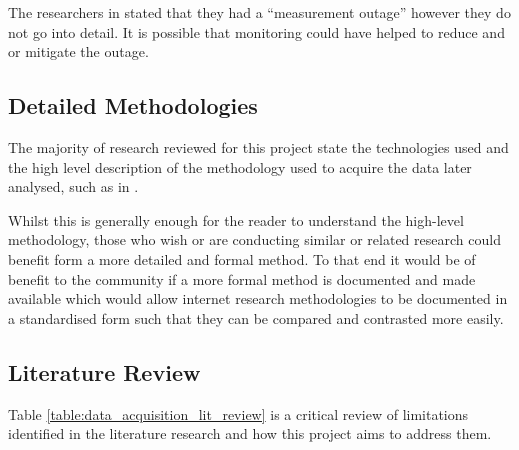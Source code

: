 \documentclass{mscreport}
\begin{document}
\vspace{0.3cm} \noindent
The researchers in \cite{Poteat2021-zr} stated that they had a ``measurement outage'' however they do not go into detail. It is possible that monitoring could have helped to reduce and or mitigate the outage.

\subsection{Detailed Methodologies}

The majority of research reviewed for this project state the technologies used and the high level description of the methodology used to acquire the data later analysed, such as in \cite{Amann2017-co,Chen2016-dl,Van_Goethem2014-ao}.

\vspace{0.3cm} \noindent
Whilst this is generally enough for the reader to understand the high-level methodology, those who wish or are conducting similar or related research could benefit form a more detailed and formal method. To that end it would be of benefit to the community if a more formal method is documented and made available which would allow internet research methodologies to be documented in a standardised form such that they can be compared and contrasted more easily.

\subsection{Literature Review}

Table \ref{table:data_acquisition_lit_review} is a critical review of limitations identified in the literature research and how this project aims to address them.
\end{document}
